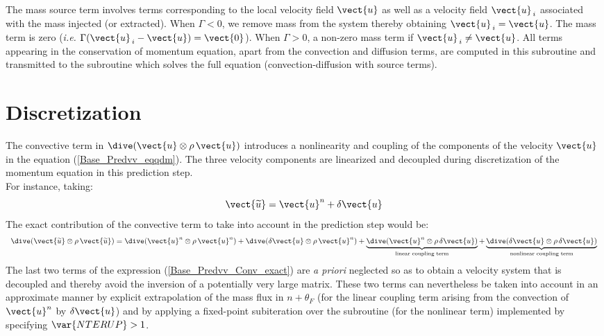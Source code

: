 The mass source term involves terms corresponding to the local velocity field
$\vect {u}$ as well as a velocity field $\vect {u}_{\,i}$
associated with the mass injected (or extracted). When $\Gamma<0$, we remove mass from the system thereby
obtaining $\vect{u}_{\,i} = \vect{u}$. The mass term is zero (\emph{i.e.} $\Gamma
(\vect{u}_{\,i}-\vect{u})= \vect{0} $). When $\Gamma>0$, a non-zero
mass term if $\vect{u}_{\,i} \ne \vect{u}$.
All terms appearing in the conservation of momentum equation, apart from
the convection and diffusion terms, are computed in this subroutine and
transmitted to the
subroutine  which solves the full equation (convection-diffusion with source terms).

\section*{Discretization}

The convective term in $\dive(\vect{u} \otimes \rho\,\vect{u})$
introduces a nonlinearity and coupling of the components of the velocity
$\vect{u}$ in the equation (\ref{Base_Predvv_eqqdm}). The three velocity
components are linearized and decoupled during discretization of the momentum
equation in this prediction step.\\
For instance, taking:
\begin{equation}
\vect{\widetilde{u}}= \vect{u}^n + \delta \vect{u}
\end{equation}
The exact contribution of the convective term to take into account in the prediction step would be:
\begin{equation}\label{Base_Predvv_Conv_exact}
\begin{array}{ll}
\dive(\vect{\widetilde{u}} \otimes \rho\,\vect{\widetilde{u}}) =
\dive(\vect{u}^{n} \otimes \rho\,\vect{u}^{n}) + \dive(\delta \vect{u} \otimes
\rho\,\vect{u}^{n}) +  \underbrace { \dive(\vect{u}^{n} \otimes
\rho\,\delta \vect{u})}_{\text {linear coupling term}} +  \underbrace { \dive(\delta \vect{u} \otimes
\rho\,\delta \vect{u})}_{\text {nonlinear coupling term}}\\
\end{array}
\end{equation}
The last two terms of the expression (\ref{Base_Predvv_Conv_exact}) are {\em a priori} neglected
so as to obtain a velocity system that is decoupled and thereby avoid the
inversion of a potentially very large matrix. These two terms can
nevertheless be taken into account in an approximate manner by explicit
extrapolation of the mass flux in $n+\theta_F$ (for the linear coupling term
arising from the convection of $\vect{u}^{n}$ by $\delta \vect{u}$) and by
applying a fixed-point subiteration over the subroutine  (for
the nonlinear term) implemented by specifying  $\var{NTERUP}>1$.

